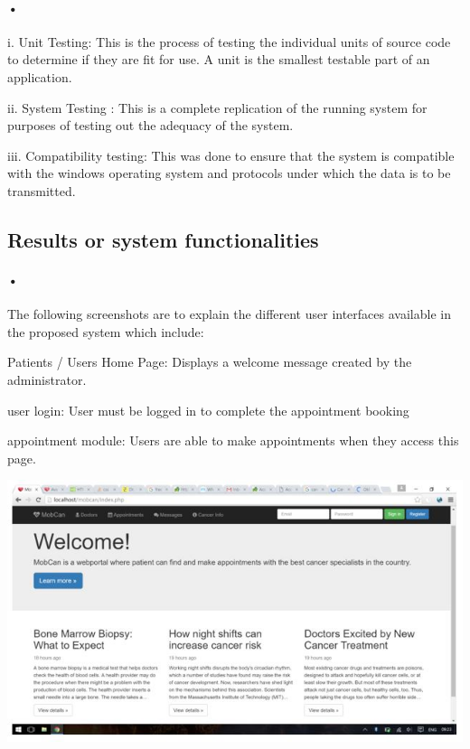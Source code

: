 \documentclass[12pt]{article}
\begin{document}
\paragraph{•}i.	 Unit Testing: This is the process of testing the individual units of source code to determine if they are fit for use. A unit is the smallest testable part of an application.

ii.	System Testing : This is a complete replication of the running system for purposes of testing out the adequacy of the system. 

iii.	Compatibility testing: This was done to ensure that the system is compatible with the windows operating system and protocols under which the data is to be transmitted. 

\subsection{Results or system functionalities}
\paragraph{•}The following screenshots are to explain the different user interfaces available in the proposed system which include: 

Patients / Users Home Page: Displays a welcome message created by the administrator.

user login: User must be logged in to complete the appointment booking

appointment module: Users are able to make appointments when they access this page.


\begin{center}
\includegraphics[scale=0.8]{home}
\end{center}
\end{document}
